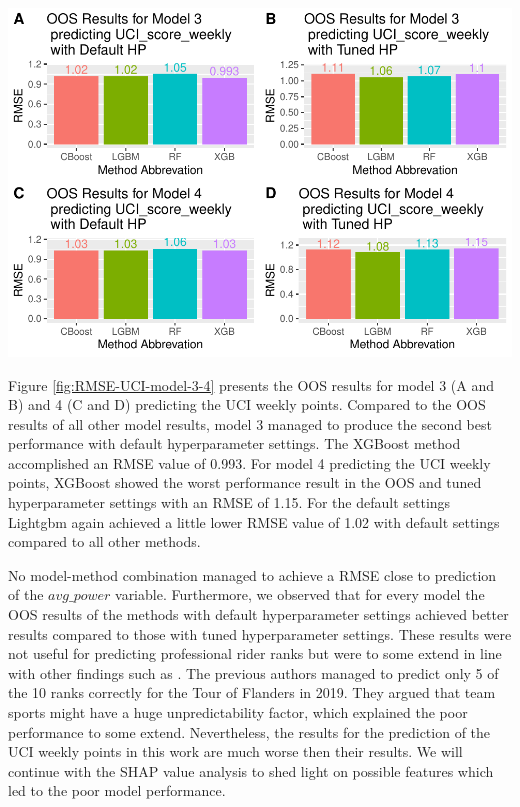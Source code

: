 \documentclass[12pt,a4paper]{article}
\let\origfigure\figure
\let\endorigfigure\endfigure
\renewenvironment{figure}[1][2] {
    \expandafter\origfigure\expandafter[H]
} {
    \endorigfigure
}
\begin{document}
\begin{figure}[!H]
\includegraphics{Master_Thesis_files/figure-latex/RMSE-UCI-model-3-4-1} \caption{OOS results for UCI weekly points prediction with model 3 and 4}\label{fig:RMSE-UCI-model-3-4}
\end{figure}

Figure \ref{fig:RMSE-UCI-model-3-4} presents the OOS results for model 3 (A and B) and 4 (C and D) predicting the UCI weekly points. Compared to the OOS results of all other model results, model 3 managed to produce the second best performance with default hyperparameter settings. The XGBoost method accomplished an RMSE value of 0.993. For model 4 predicting the UCI weekly points, XGBoost showed the worst performance result in the OOS and tuned hyperparameter settings with an RMSE of 1.15. For the default settings Lightgbm again achieved a little lower RMSE value of 1.02 with default settings compared to all other methods.

No model-method combination managed to achieve a RMSE close to prediction of the \(avg\_power\) variable. Furthermore, we observed that for every model the OOS results of the methods with default hyperparameter settings achieved better results compared to those with tuned hyperparameter settings. These results were not useful for predicting professional rider ranks but were to some extend in line with other findings such as \textcite{Brefeld2020}. The previous authors managed to predict only 5 of the 10 ranks correctly for the Tour of Flanders in 2019. They argued that team sports might have a huge unpredictability factor, which explained the poor performance to some extend. Nevertheless, the results for the prediction of the UCI weekly points in this work are much worse then their results. We will continue with the SHAP value analysis to shed light on possible features which led to the poor model performance.
\end{document}

